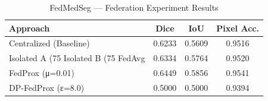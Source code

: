 \begin{table}[h]
\centering
\caption{FedMedSeg — Federation Experiment Results}
\label{tab:federation_results}
\begin{tabular}{l c c c}
\hline
\textbf{Approach} & \textbf{Dice} & \textbf{IoU} & \textbf{Pixel Acc.} \\
\hline
  Centralized (Baseline) & 0.6233 & 0.5609 & 0.9516 \\
  Isolated A (75%
  Isolated B (75%
  FedAvg & 0.6334 & 0.5764 & 0.9520 \\
  FedProx (μ=0.01) & 0.6449 & 0.5856 & 0.9541 \\
  DP-FedProx (ε=8.0) & 0.5000 & 0.5000 & 0.9394 \\
\hline
\end{tabular}
\end{table}